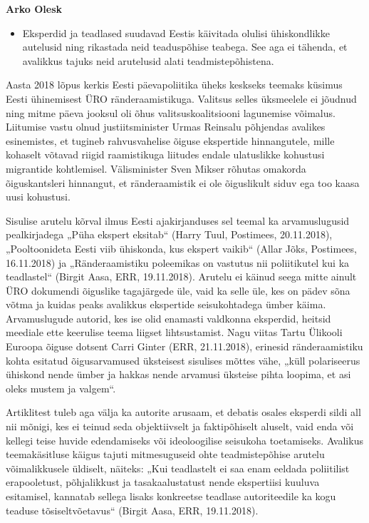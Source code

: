 \documentclass[estonian,]{article}
\providecommand{\tightlist}{%
  \setlength{\itemsep}{0pt}\setlength{\parskip}{0pt}}
\begin{document}
\begin{authors}
\textbf{Arko Olesk}
\end{authors}

\begin{points}
\begin{itemize}
\tightlist
\item
  Eksperdid ja teadlased suudavad Eestis käivitada olulisi ühiskondlikke
  autelusid ning rikastada neid teaduspõhise teabega. See aga ei
  tähenda, et avalikkus tajuks neid arutelusid alati teadmistepõhistena.
\end{itemize}
\end{points}

Aasta 2018 lõpus kerkis Eesti päevapoliitika üheks keskseks teemaks küsimus Eesti ühinemisest ÜRO ränderaamistikuga. Valitsus selles üksmeelele ei jõudnud ning mitme päeva jooksul oli õhus valitsuskoalitsiooni lagunemise võimalus. Liitumise vastu olnud justiitsminister Urmas Reinsalu põhjendas avalikes esinemistes, et tugineb rahvusvahelise õiguse ekspertide hinnangutele, mille kohaselt võtavad riigid raamistikuga liitudes endale ulatuslikke kohustusi migrantide kohtlemisel. Välisminister Sven Mikser rõhutas omakorda õiguskantsleri hinnangut, et ränderaamistik ei ole õiguslikult siduv ega too kaasa uusi kohustusi.

Sisulise arutelu kõrval ilmus Eesti ajakirjanduses sel teemal ka arvamuslugusid pealkirjadega „Püha ekspert eksitab`` (Harry Tuul, Postimees, 20.11.2018), „Pooltoonideta Eesti viib ühiskonda, kus ekspert vaikib`` (Allar Jõks, Postimees, 16.11.2018) ja „Ränderaamistiku poleemikas on vastutus nii poliitikutel kui ka teadlastel`` (Birgit Aasa, ERR, 19.11.2018). Arutelu ei käinud seega mitte ainult ÜRO dokumendi õiguslike tagajärgede üle, vaid ka selle üle, kes on pädev sõna võtma ja kuidas peaks avalikkus ekspertide seisukohtadega ümber käima. Arvamuslugude autorid, kes ise olid enamasti valdkonna eksperdid, heitsid meediale ette keerulise teema liigset lihtsustamist. Nagu viitas Tartu Ülikooli Euroopa õiguse dotsent Carri Ginter (ERR, 21.11.2018), erinesid ränderaamistiku kohta esitatud õigusarvamused üksteisest sisulises mõttes vähe, „küll polariseerus ühiskond nende ümber ja hakkas nende arvamusi üksteise pihta loopima, et asi oleks mustem ja valgem``.

Artiklitest tuleb aga välja ka autorite arusaam, et debatis osales eksperdi sildi all nii mõnigi, kes ei teinud seda objektiivselt ja faktipõhiselt aluselt, vaid enda või kellegi teise huvide edendamiseks või ideoloogilise seisukoha toetamiseks. Avalikus teemakäsitluse käigus tajuti mitmesuguseid ohte teadmistepõhise arutelu võimalikkusele üldiselt, näiteks: „Kui teadlastelt ei saa enam eeldada poliitilist erapooletust, põhjalikkust ja tasakaalustatust nende ekspertiisi kuuluva esitamisel, kannatab sellega lisaks konkreetse teadlase autoriteedile ka kogu teaduse tõsiseltvõetavus`` (Birgit Aasa, ERR, 19.11.2018).
\end{document}

